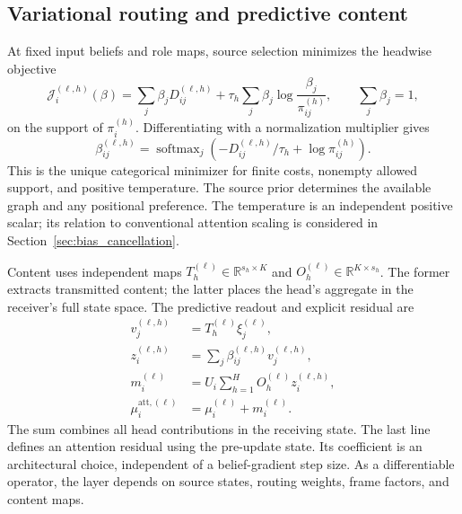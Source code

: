 \documentclass[twoside,11pt]{article}
\newcommand{\softmax}{\operatorname{softmax}}
\begin{document}
\subsection{Variational routing and predictive content}

At fixed input beliefs and role maps, source selection minimizes the headwise objective
\begin{equation}
\mathcal J_i^{(\ell,h)}(\beta)
=\sum_j\beta_jD_{ij}^{(\ell,h)}
+\tau_h\sum_j\beta_j\log\frac{\beta_j}{\pi_{ij}^{(h)}},
\qquad \sum_j\beta_j=1,
\label{eq:relational_routing_objective}
\end{equation}
on the support of $\pi_i^{(h)}$. Differentiating with a normalization multiplier gives
\begin{equation}
\beta_{ij}^{(\ell,h)}
=\softmax_j\left(-D_{ij}^{(\ell,h)}/\tau_h+\log\pi_{ij}^{(h)}\right).
\label{eq:relational_routing}
\end{equation}
This is the unique categorical minimizer for finite costs, nonempty allowed support, and positive temperature. The source prior determines the available graph and any positional preference. The temperature is an independent positive scalar; its relation to conventional attention scaling is considered in Section~\ref{sec:bias_cancellation}.

Content uses independent maps $T_h^{(\ell)}\in\mathbb R^{s_h\times K}$ and $O_h^{(\ell)}\in\mathbb R^{K\times s_h}$. The former extracts transmitted content; the latter places the head's aggregate in the receiver's full state space. The predictive readout and explicit residual are
\begin{align}
v_j^{(\ell,h)}&=T_h^{(\ell)}\xi_j^{(\ell)},\\
z_i^{(\ell,h)}&=\sum_j\beta_{ij}^{(\ell,h)}v_j^{(\ell,h)},\\
m_i^{(\ell)}&=U_i\sum_{h=1}^{H}O_h^{(\ell)}z_i^{(\ell,h)},\\
\mu_i^{\mathrm{att},(\ell)}&=\mu_i^{(\ell)}+m_i^{(\ell)}.
\label{eq:relational_predictive_residual}
\end{align}
The sum combines all head contributions in the receiving state. The last line defines an attention residual using the pre-update state. Its coefficient is an architectural choice, independent of a belief-gradient step size. As a differentiable operator, the layer depends on source states, routing weights, frame factors, and content maps.
\end{document}
